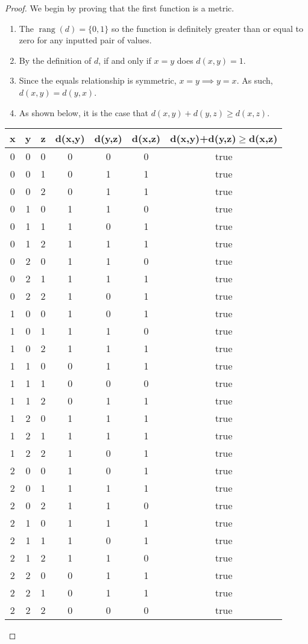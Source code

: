\documentclass[10pt]{article}
\theoremstyle{definition}
\theoremstyle{plain}
\DeclareMathOperator\rang{rang}
\begin{document}
\begin{proof}
  We begin by proving that the first function is a metric.
  \begin{enumerate}
    \item The $\rang(d)=\{0,1\}$ so the function is definitely greater than or equal to zero for any inputted pair of values.
    \item By the definition of $d$, if and only if $x=y$ does $d(x,y)=1$.
    \item Since the equals relationship is symmetric, $x=y \implies y=x$. As such, $d(x,y) = d(y,x)$.
    \item As shown below, it is the case that $d(x,y) + d(y,z) \geq d(x,z)$.
  \end{enumerate}

  \begin{center}
    \begin{tabular}{|c|c|c|c|c|c|c|} \hline
      x & y & z & d(x,y) & d(y,z) & d(x,z) & d(x,y)+d(y,z)$\geq$d(x,z) \tabularnewline \hline

      0 & 0 & 0 & 0 & 0 & 0 & true \tabularnewline \hline
      0 & 0 & 1 & 0 & 1 & 1 & true \tabularnewline \hline
      0 & 0 & 2 & 0 & 1 & 1 & true \tabularnewline \hline
      0 & 1 & 0 & 1 & 1 & 0 & true \tabularnewline \hline
      0 & 1 & 1 & 1 & 0 & 1 & true \tabularnewline \hline
      0 & 1 & 2 & 1 & 1 & 1 & true \tabularnewline \hline
      0 & 2 & 0 & 1 & 1 & 0 & true \tabularnewline \hline
      0 & 2 & 1 & 1 & 1 & 1 & true \tabularnewline \hline
      0 & 2 & 2 & 1 & 0 & 1 & true \tabularnewline \hline

      1 & 0 & 0 & 1 & 0 & 1 & true \tabularnewline \hline
      1 & 0 & 1 & 1 & 1 & 0 & true \tabularnewline \hline
      1 & 0 & 2 & 1 & 1 & 1 & true \tabularnewline \hline
      1 & 1 & 0 & 0 & 1 & 1 & true \tabularnewline \hline
      1 & 1 & 1 & 0 & 0 & 0 & true \tabularnewline \hline
      1 & 1 & 2 & 0 & 1 & 1 & true \tabularnewline \hline
      1 & 2 & 0 & 1 & 1 & 1 & true \tabularnewline \hline
      1 & 2 & 1 & 1 & 1 & 1 & true \tabularnewline \hline
      1 & 2 & 2 & 1 & 0 & 1 & true \tabularnewline \hline

      2 & 0 & 0 & 1 & 0 & 1 & true \tabularnewline \hline
      2 & 0 & 1 & 1 & 1 & 1 & true \tabularnewline \hline
      2 & 0 & 2 & 1 & 1 & 0 & true \tabularnewline \hline
      2 & 1 & 0 & 1 & 1 & 1 & true \tabularnewline \hline
      2 & 1 & 1 & 1 & 0 & 1 & true \tabularnewline \hline
      2 & 1 & 2 & 1 & 1 & 0 & true \tabularnewline \hline
      2 & 2 & 0 & 0 & 1 & 1 & true \tabularnewline \hline
      2 & 2 & 1 & 0 & 1 & 1 & true \tabularnewline \hline
      2 & 2 & 2 & 0 & 0 & 0 & true \tabularnewline \hline
    \end{tabular}
  \end{center}


\end{proof}
\end{document}
